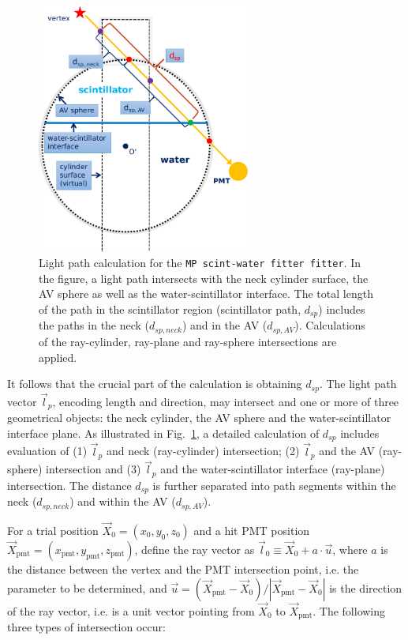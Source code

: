 \begin{figure}[!htb]
	\centering
	\includegraphics[width=7cm]{scintpath.png}
	\caption[Light path calculation for the \texttt{MP scint-water fitter fitter}.]{Light path calculation for the \texttt{MP scint-water fitter fitter}. In the figure, a light path intersects with the neck cylinder surface, the AV sphere as well as the water-scintillator interface. The total length of the path in the scintillator region (scintillator path, $d_{sp}$) includes the paths in the neck ($d_{sp,neck}$) and in the AV ($d_{sp,AV}$). Calculations of the ray-cylinder, ray-plane and ray-sphere intersections are applied.}
	\label{fig:scintpath}
\end{figure}

It follows that the crucial part of the calculation is obtaining $d_{sp}$. The light path vector $\vec{l}_p$, encoding length and direction, may intersect and one or more of three geometrical objects: the neck cylinder, the AV sphere and the water-scintillator interface plane. As illustrated in Fig.~\ref{fig:scintpath}, a detailed calculation of $d_{sp}$ includes evaluation of (1) $\vec{l}_p$ and neck (ray-cylinder) intersection; (2) $\vec{l}_p$ and the AV (ray-sphere) intersection and (3) $\vec{l}_p$ and the water-scintillator interface (ray-plane) intersection. The distance $d_{sp}$ is further separated into path segments within the neck ($d_{sp,neck}$) and within the AV ($d_{sp,AV}$). 

For a trial position $\vec{X}_0=(x_0,y_0,z_0)$ and a hit PMT position $\vec{X}_{\mathrm{pmt}}=(x_\mathrm{pmt},y_\mathrm{pmt},z_\mathrm{pmt})$, define the ray vector as $\vec{l}_0\equiv\vec{X}_0+a\cdot \vec{u}$, where $a$ is the distance between the vertex and the PMT intersection point, i.e. the parameter to be determined, and $\vec u=(\vec{X}_{\mathrm{pmt}}-\vec{X}_0 ) / |\vec{X}_{\mathrm{pmt}}-\vec{X}_0|$ is the direction of the ray vector, i.e. is a unit vector pointing from $\vec{X}_0$ to $\vec{X}_{\mathrm{pmt}}$. The following three types of intersection occur:

